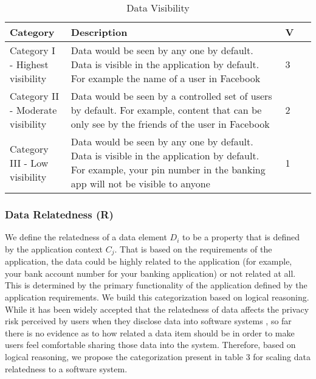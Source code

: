 \documentclass[10pt]{article}
\begin{document}
\begin{center}
\begin{table}[htbp]
\caption{Data Visibility}
\begin{center}
\begin{adjustbox}{width=0.5\textwidth} 
\begin{tabular}{|p{0.2\linewidth}|p{0.7\linewidth}|p{0.1\linewidth}|} 
\hline
Category & Description & V \\
\hline
Category I - Highest visibility & Data would be seen by any one by default. Data is visible in the application by default. For example the name of a user in Facebook & 3 \\
\hline
Category II - Moderate visibility & Data would be seen by a controlled set of users by default. For example, content that can be only see by the friends of the user in Facebook & 2 \\
\hline
Category III - Low visibility & Data would be seen by any one by default. Data is visible in the application by default. For example, your pin number in the banking app will not be visible to anyone & 1 \\
\hline
\end{tabular}
\end{adjustbox}
\end{center}
\end{table}
\end{center} 

\subsubsection{Data Relatedness (R)} 

We define the relatedness of a data element \textit {$D_i$} to be a property that is defined by the application context \textit {$C_j$}. That is based on the requirements of the application, the data could be highly related to the application (for example, your bank account number for your banking application) or not related at all. This is determined by the primary functionality of the application defined by the application requirements. We build this categorization based on logical reasoning. While it has been widely accepted that the relatedness of data affects the privacy risk perceived by users when they disclose data into software systems  \cite {nissenbaum2009privacy, john2010strangers}, so far there is no evidence as to how related a data item should be in order to make users feel comfortable sharing those data into the system. Therefore, based on logical reasoning, we propose the categorization present in table 3 for scaling data relatedness to a software system. 
\end{document}
